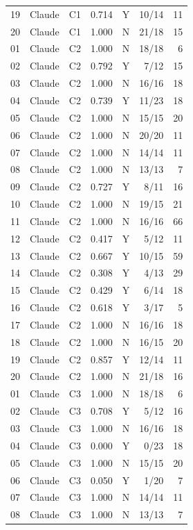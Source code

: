 \begin{longtable}{llrrlrr}
    19 & Claude & C1 & 0.714 & Y & 10/14 & 11 \\
    20 & Claude & C1 & 1.000 & N & 21/18 & 15 \\
    01 & Claude & C2 & 1.000 & N & 18/18 & 6 \\
    02 & Claude & C2 & 0.792 & Y & 7/12 & 15 \\
    03 & Claude & C2 & 1.000 & N & 16/16 & 18 \\
    04 & Claude & C2 & 0.739 & Y & 11/23 & 18 \\
    05 & Claude & C2 & 1.000 & N & 15/15 & 20 \\
    06 & Claude & C2 & 1.000 & N & 20/20 & 11 \\
    07 & Claude & C2 & 1.000 & N & 14/14 & 11 \\
    08 & Claude & C2 & 1.000 & N & 13/13 & 7 \\
    09 & Claude & C2 & 0.727 & Y & 8/11 & 16 \\
    10 & Claude & C2 & 1.000 & N & 19/15 & 21 \\
    11 & Claude & C2 & 1.000 & N & 16/16 & 66 \\
    12 & Claude & C2 & 0.417 & Y & 5/12 & 11 \\
    13 & Claude & C2 & 0.667 & Y & 10/15 & 59 \\
    14 & Claude & C2 & 0.308 & Y & 4/13 & 29 \\
    15 & Claude & C2 & 0.429 & Y & 6/14 & 18 \\
    16 & Claude & C2 & 0.618 & Y & 3/17 & 5 \\
    17 & Claude & C2 & 1.000 & N & 16/16 & 18 \\
    18 & Claude & C2 & 1.000 & N & 16/15 & 20 \\
    19 & Claude & C2 & 0.857 & Y & 12/14 & 11 \\
    20 & Claude & C2 & 1.000 & N & 21/18 & 16 \\
    01 & Claude & C3 & 1.000 & N & 18/18 & 6 \\
    02 & Claude & C3 & 0.708 & Y & 5/12 & 16 \\
    03 & Claude & C3 & 1.000 & N & 16/16 & 18 \\
    04 & Claude & C3 & 0.000 & Y & 0/23 & 18 \\
    05 & Claude & C3 & 1.000 & N & 15/15 & 20 \\
    06 & Claude & C3 & 0.050 & Y & 1/20 & 7 \\
    07 & Claude & C3 & 1.000 & N & 14/14 & 11 \\
    08 & Claude & C3 & 1.000 & N & 13/13 & 7 \\

\end{longtable}
